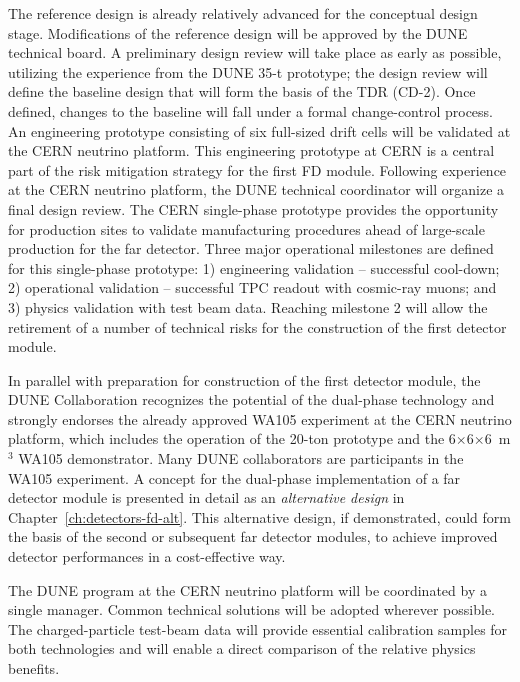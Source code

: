 The reference design is already relatively advanced for  the 
conceptual design
stage. Modifications of the reference design will
be approved by the DUNE technical board. A preliminary design
review will take place as early as possible, utilizing the experience
from the DUNE 35-t prototype; the design review will define the
baseline design that will form the basis of the TDR (CD-2).  Once
defined, changes to the baseline will fall under a formal
change-control process. An engineering prototype consisting of
six full-sized drift cells will be validated at the CERN neutrino
platform.  This engineering
prototype at CERN is a central part of the risk mitigation strategy
for the first  FD module. Following experience at the CERN
neutrino platform, the DUNE technical coordinator will organize a
final design review. The CERN single-phase prototype provides the opportunity for
production sites to validate manufacturing procedures ahead of
large-scale production for the far detector. Three major operational
milestones are defined for this single-phase prototype: 1) engineering
validation -- successful cool-down; 2) operational validation --
successful TPC readout with cosmic-ray muons; and 3) physics
validation with test beam data. Reaching milestone 2 will allow the
retirement of a number of technical risks for the construction of the
first  detector module.

In parallel with preparation for construction of the first 
detector module, the DUNE Collaboration recognizes the potential of
the dual-phase technology and strongly endorses the already
approved WA105 experiment
 at the CERN neutrino platform, which
includes the operation of the 20-ton prototype and the
6$\times$6$\times$6~m$^3$ WA105 demonstrator. 
Many DUNE collaborators are participants in the WA105
experiment. A concept for the dual-phase implementation of a far detector module
is presented in detail as an \textit{alternative design} in
Chapter~\ref{ch:detectors-fd-alt}. This alternative design, if
demonstrated, could form the basis of the second or subsequent 
far detector modules, to achieve improved detector performances in a
cost-effective way.

The DUNE program at the CERN neutrino platform will be coordinated by
a single manager. Common technical solutions will be adopted
wherever possible.  The charged-particle test-beam data will provide
essential calibration samples for both technologies and will enable a
direct comparison of the relative physics benefits.

